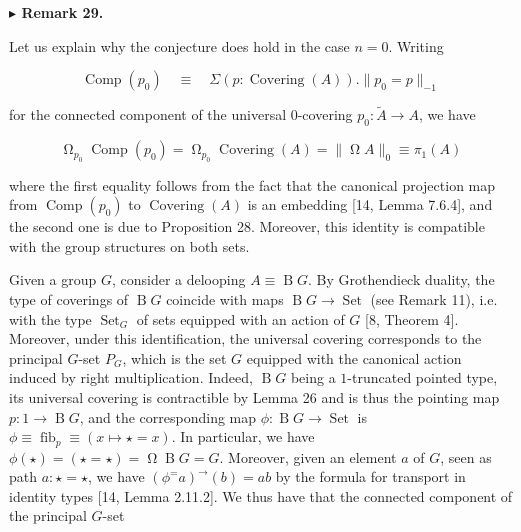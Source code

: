  
 
\par\medskip\noindent\textbf{$\blacktriangleright$ Remark 29.}\par
 
 
Let us explain why the conjecture does hold in the case $n=0$. Writing\par
  
\par  \quad  \[\operatorname{Comp}(p_{0})\quad\equiv\quad\Sigma(p:\operatorname{Covering}(A)).\|p_{0}=p\|_{-1}\]\quad  \quad  
  
for the connected component of the universal 0-covering $p_{0}:\tilde{A}\to A$, we have\par
  
\par  \quad  \[\operatorname{\Omega}_{p_{0}}\operatorname{Comp}(p_{0})=\operatorname{\Omega}_{p_{0}}\operatorname{Covering}(A)=\|\operatorname{\Omega}A\|_{0}\equiv\pi_{1}(A)\]\quad  \quad  
  
where the first equality follows from the fact that the canonical projection map from $\operatorname{Comp}(p_{0})$ to $\operatorname{Covering}(A)$ is an embedding [14, Lemma 7.6.4], and the second one is due to Proposition 28. Moreover, this identity is compatible with the group structures on both sets.\par
 
 
 
Given a group $G$, consider a delooping $A\equiv\operatorname{B}G$. By Grothendieck duality, the type of coverings of $\operatorname{B}G$ coincide with maps $\operatorname{B}G\to\operatorname{Set}$ (see Remark 11), i.e. with the type $\operatorname{Set}_{G}$ of sets equipped with an action of $G$ [8, Theorem 4]. Moreover, under this identification, the universal covering corresponds to the principal $G$-set $P_{G}$, which is the set $G$ equipped with the canonical action induced by right multiplication. Indeed, $\operatorname{B}G$ being a $1$-truncated pointed type, its universal covering is contractible by Lemma 26 and is thus the pointing map $p:1\to\operatorname{B}G$, and the corresponding map $\phi:\operatorname{B}G\to\operatorname{Set}$ is $\phi\equiv\operatorname{fib}_{p}\equiv(x\mapsto\star=x)$. In particular, we have $\phi(\star)=(\star=\star)=\operatorname{\Omega}\operatorname{B}G=G$. Moreover, given an element $a$ of $G$, seen as path $a:\star=\star$, we have $(\phi^{=}a)^{\to}(b)=ab$ by the formula for transport in identity types [14, Lemma 2.11.2]. We thus have that the connected component of the principal $G$-set\par
  
